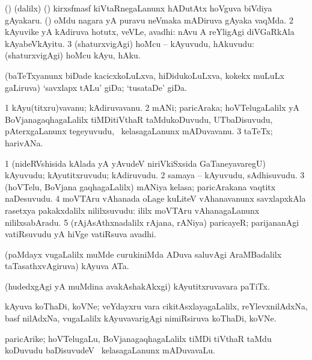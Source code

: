 \bentry
{} 
\gl{\nA}
\expl{}
\bmng
\bnum
{} (\birx) (\bava dalilx) 
\banum
{} (\pArxparx) kirxsfmasf kiVtaRnegaLanunx hADutAtx hoVguva biVdiya gAyakaru. 
 (\ca) oMdu nagara yA puravu neVmaka mADiruva gAyaka vaqMda. 
\eanum
\numie
\num{2} kAyuvike yA kAdiruva hotutx, veVLe, avadhi:  nAvu A reYligAgi diVGaRkAla kAyabeVkAyitu. 
\num{3} (shaturxvigAgi) hoMcu -- kAyuvudu, hAkuvudu:  (shaturxvigAgi) hoMcu kAyu, hAku. 
\enum
\emng
\eentry

\bentry
{} 
\gl{\nA}
\expl{}
\bmng
(baTeTxyanunx biDade kacicxkoLuLxva, hiDidukoLuLxva, kokekx muLuLx gaLiruva) `savxlapx tALu' giDa; `tusataDe' giDa. 
\emng
\eentry

\bentry
{} 
\gl{\nA}
\bmng
\bnum
\num{1} kAyu(titxru)vavanu; kAdiruvavanu. 
\num{2} mANi; paricAraka; hoVTelugaLalilx yA BoVjanagaqhagaLalilx tiMDitiVthaR taMdukoDuvudu, UTbaDisuvudu, pAterxgaLanunx tegeyuvudu, \mo\ kelasagaLanunx mADuvavanu. 
\num{3} taTeTx; harivANa. 
\enum
\emng
\eentry

\bentry
{} 
\gl{\nA}
\bmng
\bnum
\num{1} (nideRVshisida kAlada yA yAvudeV niriVkiSxsida GaTaneyavaregU) kAyuvudu; kAyutitxruvudu; kAdiruvudu. 
\num{2} samaya -- kAyuvudu, sAdhisuvudu. 
\num{3} (hoVTelu, BoVjana gaqhagaLalilx) mANiya kelasa; paricArakana vaqtitx naDesuvudu. 
\num{4} moVTAru vAhanada oLage kuLiteV vAhanavanunx savxlapxkAla rasetxya pakakxdalilx nililxsuvudu:  ililx moVTAru vAhanagaLanunx nililxsabAradu. 
\num{5} (rAjAsAthxnadalilx rAjana, rANiya) paricayeR; parijananAgi vatiRsuvudu yA hiVge vatiRsuva avadhi. 
\enum
\emng
\eentry

\bentry
{}
\gl{\nA}
\expl{}
\bmng
(paMdayx \mo vugaLalilx muMde curukiniMda ADuva saluvAgi AraMBadalilx taTasathxvAgiruva) kAyuva ATa. 
\emng
\eentry

\bentry
{} 
\gl{\nA}
\expl{}
\bmng
(hudedxgAgi yA muMdina avakAshakAkxgi) kAyutitxruvavara paTiTx. 
\emng
\eentry

\bentry
{} 
\gl{\nA}
\expl{}
\bmng
kAyuva koThaDi, koVNe; veYdayxru \mo vara cikitAsxlayagaLalilx, reYlevxnilAdxNa, basf nilAdxNa, \mo vugaLalilx kAyuvavarigAgi nimiRsiruva koThaDi, koVNe. 
\emng
\eentry

\bentry
{} 
\gl{\nA}
\bmng
paricArike; hoVTelugaLu, BoVjanagaqhagaLalilx tiMDi tiVthaR taMdu koDuvudu baDisuvudeV \mo\ kelasagaLanunx mADuvavaLu. 
\emng
\eentry


